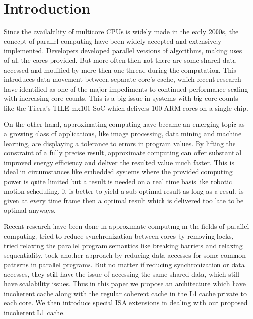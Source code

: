 \documentclass[12pt,conference]{IEEEtran}
\begin{document}




%
\IEEEpeerreviewmaketitle



\section{Introduction}

Since the availability of multicore CPUs is widely made in the
early 2000s, the concept of parallel computing have been widely accepted 
and extensively implemented. Developers developed parallel versions
of algorithms, making uses of all the cores provided. But more often then not
there are some shared data accessed and modified by more then one
thread during the computation. This introduces data movement between
separate core's cache, which recent research have identified as one of the major
impediments to continued performance scaling with increasing core counts. This
is a big issue in systems with big core counts like the Tilera's TILE-mx100 SoC 
which delivers 100 ARM cores on a single chip\cite{tile}.

On the other hand, approximating computing have became an emerging topic
as a growing class of applications, like image processing, data mining 
and machine learning, are displaying a tolerance to errors in program values.
By lifting the constraint of a fully precise result, approximate computing
can offer substantial improved energy efficiency and deliver the resulted
value much faster. This is ideal in circumstances like embedded systems where
the provided computing power is quite limited but a result is needed on a real
time basis like robotic motion scheduling, it is better to yield a sub optimal 
result as long as a result is given at every time frame then a optimal result
which is delivered too late to be optimal anyways.

Recent research have been done in approximate computing in the fields of
parallel computing, \cite{ibm} tried to reduce synchronization between cores 
by removing locks, \cite{helixup} tried relaxing the parallel program 
semantics like breaking barriers and relaxing sequentiality, \cite{paraprox}
took another approach by reducing data accesses for some common patterns in
parallel programs. But no matter if reducing synchronization or data accesses,
they still have the issue of accessing the same shared data, which still
have scalability issues. Thus in this paper we propose an architecture which
have incoherent cache along with the regular coherent cache in the L1 cache
private to each core. We then introduce special ISA extensions in dealing with
our proposed incoherent L1 cache.
\end{document}

